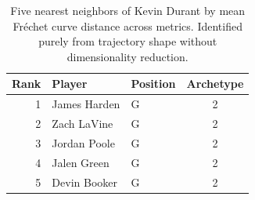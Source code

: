 \begin{table}[htbp]
  \centering\small
  \begin{tabular}{rllc}
    \toprule
    Rank & Player & Position & Archetype \\
    \midrule
    1 & James Harden & G & 2 \\
    2 & Zach LaVine & G & 2 \\
    3 & Jordan Poole & G & 2 \\
    4 & Jalen Green & G & 2 \\
    5 & Devin Booker & G & 2 \\
    \bottomrule
  \end{tabular}
  \caption{Five nearest neighbors of Kevin Durant by mean Fr\'{e}chet curve distance across metrics. Identified purely from trajectory shape without dimensionality reduction.}
  \label{tab:Kevin_Durant_frechet_curve_neighbors}
\end{table}

